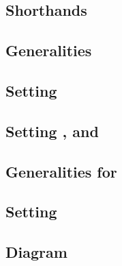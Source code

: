 \subsection{Shorthands}                                                                                                \label{bls: shorthands}                                         
\subsection{Generalities}                                                                                              \label{bls: generalities for malformed and wellformed}          
\subsection{Setting \malformedDataInternalJustification{}}                                                             \label{bls: malformed data internal justification}              
\subsection{Setting \malformedDataExternalBit, \malformedDataExternalAcc{} and \malformedDataExternalJustification}    \label{bls: malformed bit acc justification}                    
\subsection{Generalities for \pairOfPointsContainsInfinity{}}                                                          \label{bls: generalities for pair of points contains infinity}  
\subsection{Setting \nontrivialPairOfPointsAcc{}}                                                                      \label{bls: setting nontrivial pair of points acc}              
\subsection{Diagram}                                                                                                   \label{bls: setting diagrams}                                   
